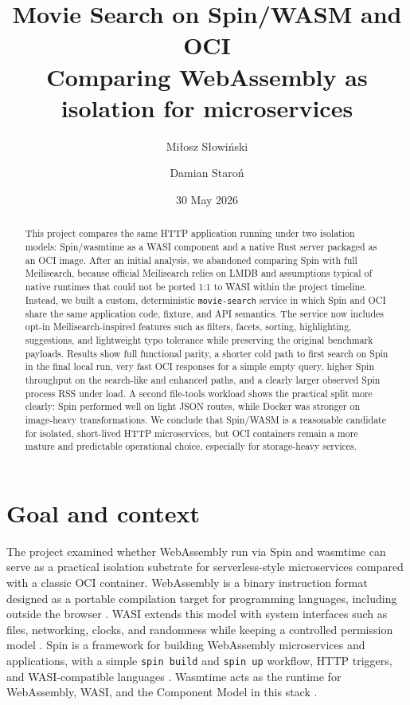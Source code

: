 \documentclass[11pt,a4paper]{article}
\title{\textbf{Movie Search on Spin/WASM and OCI}\\
\large Comparing WebAssembly as isolation for microservices}
\author{Miłosz Słowiński \and Damian Staroń}
\date{30 May 2026}
\begin{document}
\maketitle

\begin{abstract}
This project compares the same HTTP application running under two isolation models:
Spin/wasmtime as a WASI component and a native Rust server packaged as an OCI image.
After an initial analysis, we abandoned comparing Spin with full Meilisearch, because
official Meilisearch relies on LMDB and assumptions typical of native runtimes that could
not be ported 1:1 to WASI within the project timeline. Instead, we built a custom,
deterministic \texttt{movie-search} service in which Spin and OCI share the same application
code, fixture, and API semantics. The service now includes opt-in Meilisearch-inspired
features such as filters, facets, sorting, highlighting, suggestions, and lightweight typo
tolerance while preserving the original benchmark payloads. Results show full functional
parity, a shorter cold path to first search on Spin in the final local run, very fast OCI
responses for a simple empty query, higher Spin throughput on the search-like and enhanced
paths, and a clearly larger observed Spin process RSS under load. A second file-tools workload
shows the practical split more clearly: Spin performed well on light JSON routes, while Docker
was stronger on image-heavy transformations. We conclude that Spin/WASM is a reasonable
candidate for isolated, short-lived HTTP microservices, but OCI containers remain a more
mature and predictable operational choice, especially for storage-heavy services.
\end{abstract}

\section{Goal and context}

The project examined whether WebAssembly run via Spin and wasmtime can serve as a practical
isolation substrate for serverless-style microservices compared with a classic OCI container.
WebAssembly is a binary instruction format designed as a portable compilation target for
programming languages, including outside the browser \cite{webassembly}. WASI extends this
model with system interfaces such as files, networking, clocks, and randomness while keeping
a controlled permission model \cite{wasmtime-intro,wasi-interfaces}. Spin is a framework for
building WebAssembly microservices and applications, with a simple \texttt{spin build} and
\texttt{spin up} workflow, HTTP triggers, and WASI-compatible languages \cite{spin}. Wasmtime
acts as the runtime for WebAssembly, WASI, and the Component Model in this stack
\cite{wasmtime-intro}.
\end{document}
